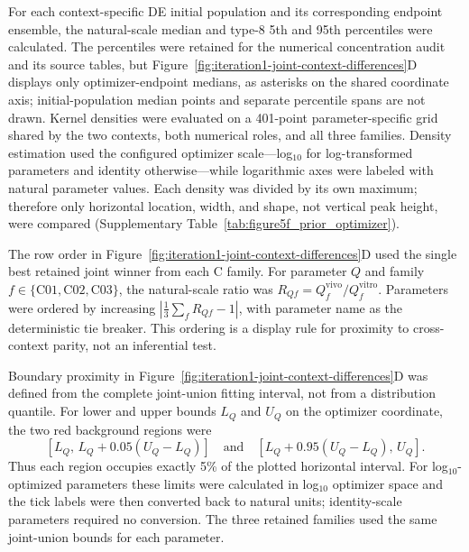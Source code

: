 \documentclass[11pt]{article}
\begin{document}
For each context-specific DE initial population and its corresponding endpoint ensemble, the natural-scale median and type-8 5th and 95th percentiles were calculated. The percentiles were retained for the numerical concentration audit and its source tables, but Figure~\ref{fig:iteration1-joint-context-differences}D displays only optimizer-endpoint medians, as asterisks on the shared coordinate axis; initial-population median points and separate percentile spans are not drawn. Kernel densities were evaluated on a 401-point parameter-specific grid shared by the two contexts, both numerical roles, and all three families. Density estimation used the configured optimizer scale---log$_{10}$ for log-transformed parameters and identity otherwise---while logarithmic axes were labeled with natural parameter values. Each density was divided by its own maximum; therefore only horizontal location, width, and shape, not vertical peak height, were compared (Supplementary Table~\ref{tab:figure5f_prior_optimizer}).

The row order in Figure~\ref{fig:iteration1-joint-context-differences}D used the single best retained joint winner from each C family. For parameter \(Q\) and family \(f\in\{\mathrm{C01},\mathrm{C02},\mathrm{C03}\}\), the natural-scale ratio was \(R_{Qf}=Q_f^{\mathrm{vivo}}/Q_f^{\mathrm{vitro}}\). Parameters were ordered by increasing \(\left|\frac{1}{3}\sum_f R_{Qf}-1\right|\), with parameter name as the deterministic tie breaker. This ordering is a display rule for proximity to cross-context parity, not an inferential test.

Boundary proximity in Figure~\ref{fig:iteration1-joint-context-differences}D was defined from the complete joint-union fitting interval, not from a distribution quantile. For lower and upper bounds $L_Q$ and $U_Q$ on the optimizer coordinate, the two red background regions were
\begin{equation}
\left[L_Q,\,L_Q+0.05(U_Q-L_Q)\right]
\quad\text{and}\quad
\left[L_Q+0.95(U_Q-L_Q),\,U_Q\right].
\label{eq:appendix_figure5d_bound_bands}
\end{equation}
Thus each region occupies exactly 5\% of the plotted horizontal interval. For log$_{10}$-optimized parameters these limits were calculated in log$_{10}$ optimizer space and the tick labels were then converted back to natural units; identity-scale parameters required no conversion. The three retained families used the same joint-union bounds for each parameter.
\end{document}
